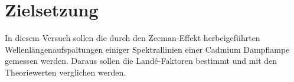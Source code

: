 \section{Zielsetzung}
\label{sec:Ziel}
In diesem Versuch sollen die durch den Zeeman-Effekt herbeigeführten
Wellenlängenaufspaltungen einiger Spektrallinien einer Cadmium Dampflampe
gemessen werden. Daraus sollen die Landé-Faktoren bestimmt und mit den
Theoriewerten verglichen werden.
